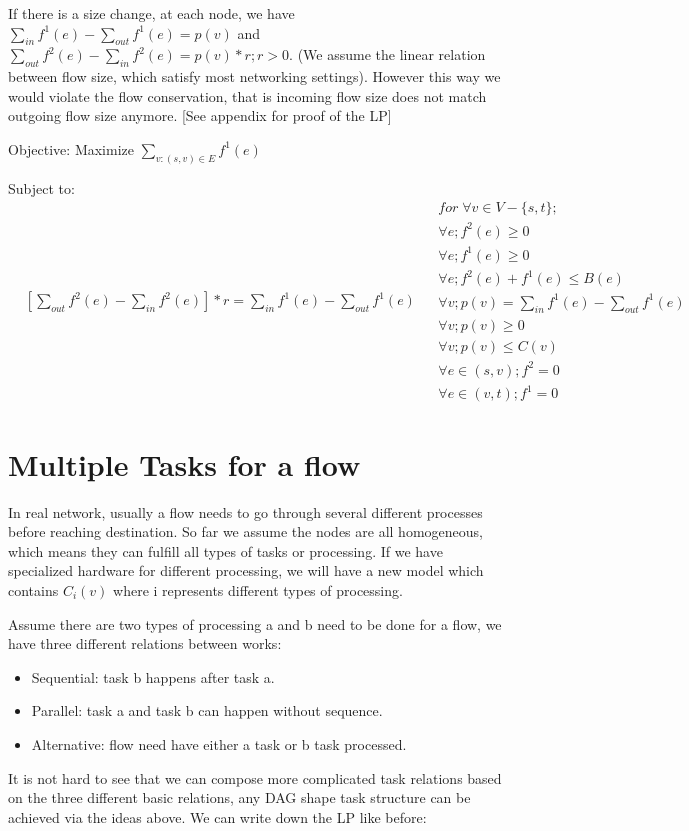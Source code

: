 \documentclass[twoside,leqno, 11pt]{article}
\begin{document}
If there is a size change, at each node, we have $\sum\limits_{in} f^1(e) - \sum\limits_{out}  f^1(e) = p(v)$ and $\sum\limits_{out} f^2(e)-\sum\limits_{in}  f^2(e) = p(v)*r; r>0$. (We assume the linear relation between flow size, which satisfy most networking settings). However this way we would violate the flow conservation, that is incoming flow size does not match outgoing flow size anymore. [See appendix for proof of the LP]

Objective: Maximize $\sum \limits_{v: (s, v) \in E} f^1(e) $

Subject to:
\begin{subequations}
\begin{align}
& [\sum\limits_{out}  f^2(e) -\sum\limits_{in} f^2(e)]*r= \sum\limits_{in } f^1(e)-  \sum\limits_{out }  f^1(e) 
\end{align}
\begin{align}
&for\; \forall v \in V-\{s, t\};\nonumber\\
&\forall e; f^2(e)\geq 0\\
&\forall e; f^1(e) \geq 0\\
&\forall e; f^2(e) + f^1(e)\leq B(e)\\
&\forall v; p(v) = \sum\limits_{in } f^1(e) - \sum\limits_{out} f^1(e) \\
&\forall v;p(v)\geq 0 \\
&\forall v;p(v)\leq C(v)\\
&\forall e\in (s,v); f^2=0\\
&\forall e\in (v,t); f^1=0
\end{align}
\end{subequations}

\section{Multiple Tasks for a flow}
In real network, usually a flow needs to go through several different processes before reaching destination. So far we assume the nodes are all homogeneous, which means they can fulfill all types of tasks or processing. If we have specialized hardware for different processing, we will have a new model which contains $C_i(v)$ where i represents different types of processing.

Assume there are two types of processing a and b need to be done for a flow, we have three different relations between works:
\begin{itemize}
\item {Sequential: task b happens after task a.}
\item{Parallel: task a and task b can happen without sequence.}
\item{Alternative: flow need have either a task or b task processed.}
\end{itemize}
It is not hard to see that we can compose more complicated task relations based on the three different basic relations, any DAG shape task structure can be achieved via the ideas above. We can write down the LP like before:
\end{document}
